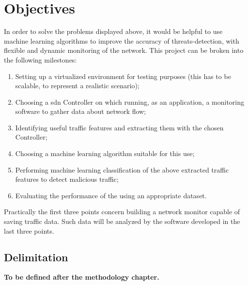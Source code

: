 
\section{Objectives}
\label{sec:objectives}

In order to solve the problems displayed above, it would be helpful to use machine learning algorithms to improve the accuracy of threats-detection, with flexible and dynamic monitoring of the network. This project can be broken into the following milestones:

\begin{enumerate}
    \item Setting up a virtualized environment for testing purposes (this has to be scalable, to represent a realistic scenario);
    \item Choosing a \gls{sdn} Controller on which running, as an application, a monitoring software to gather data about network flow;
    \item Identifying useful traffic features and extracting them with the chosen  Controller;
    \item Choosing a machine learning algorithm suitable for this use;
    \item Performing machine learning classification of the above extracted traffic features to detect malicious traffic;
    \item Evaluating the performance of the  using an appropriate dataset.
\end{enumerate}
Practically the first three points concern building a network monitor capable of saving traffic data. Such data will be analyzed by the software developed in the last three points.


\subsection{Delimitation}
\label{subsec:delimitation}

\faEdit \quad \textbf{To be defined after the methodology chapter.} \\

\lipsum[1-2]

